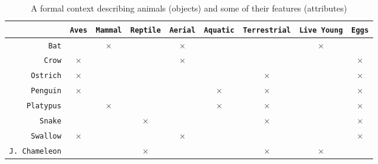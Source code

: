 \begin{table}[h]
    \centering
    \begin{tabular}{rcccccccc}
                              & \texttt{Aves} & \texttt{Mammal} & \texttt{Reptile} & \texttt{Aerial} & \texttt{Aquatic} & \texttt{Terrestrial} & \texttt{Live Young} & \texttt{Eggs} \\
        \hline
        \texttt{Bat}          &               & $\times$        &                  & $\times$        &                  &                      & $\times$            &               \\
        \texttt{Crow}         & $\times$      &                 &                  & $\times$        &                  &                      &                     & $\times$      \\
        \texttt{Ostrich}      & $\times$      &                 &                  &                 &                  & $\times$             &                     & $\times$      \\
        \texttt{Penguin}      & $\times$      &                 &                  &                 & $\times$         & $\times$             &                     & $\times$      \\
        \texttt{Platypus}     &               & $\times$        &                  &                 & $\times$         & $\times$             &                     & $\times$      \\
        \texttt{Snake}        &               &                 & $\times$         &                 &                  & $\times$             &                     & $\times$      \\
        \texttt{Swallow}      & $\times$      &                 &                  & $\times$        &                  &                      &                     & $\times$      \\
        \texttt{J. Chameleon} &               &                 & $\times$         &                 &                  & $\times$             & $\times$            &               \\
    \end{tabular}
    \vspace{10pt}
    \caption{A formal context describing animals (objects) and some of their features (attributes)}
    \label{table: formal context}
\end{table}
\clearpage


